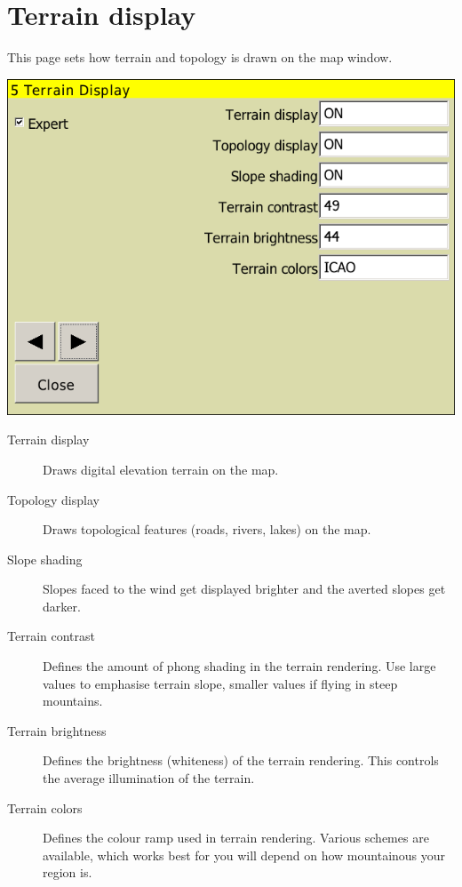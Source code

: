 \documentclass[a4paper,12pt]{refrep}
\begin{document}
\clearpage
\section{Terrain display}\label{sec:terrain-display}

This page sets how terrain and topology is drawn on the map window.

\begin{center}
\includegraphics[angle=0,width=0.8\linewidth,keepaspectratio='true']{figures/config-terrain.png}
\end{center}

\begin{description}
\item[Terrain display]  Draws digital elevation terrain on the map.
\item[Topology display]  Draws topological features (roads, rivers, lakes) on
the map.
\item[Slope shading]  \label{conf:shading} Slopes faced to the wind get
displayed brighter and the averted slopes get darker.
\item[Terrain contrast]  Defines the amount of phong shading in the terrain rendering.  Use large values 
to emphasise terrain slope, smaller values if flying in steep mountains.
\item[Terrain brightness]  Defines the brightness (whiteness) of the terrain rendering.  This controls the 
average illumination of the terrain.
\item[Terrain colors]  Defines the colour ramp used in terrain rendering.  Various schemes are available, 
which works best for you will depend on how mountainous your region is.
\end{description}
\end{document}
